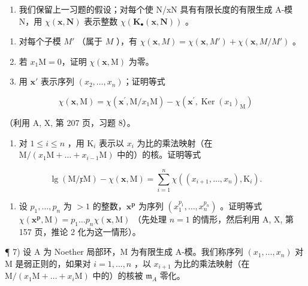 \begin{enumerate}
\def\labelenumi{\arabic{enumi})}
\setcounter{enumi}{5}
\tightlist
\item
  我们保留上一习题的假设；对每个使 N/xN 具有有限长度的有限生成 A-模 N，用 \(\chi(\mathbf{x},\mathbf{N})\) 表示整数 \(\chi(\mathbf{K}_{\bullet}(\mathbf{x},\mathbf{N}))\) 。
\end{enumerate}

\begin{enumerate}
\def\labelenumi{\alph{enumi})}
\item
  对每个子模 \(M'\) （属于 \(M\) ），有 \(\chi(\mathbf{x}, M) = \chi(\mathbf{x}, M') + \chi(\mathbf{x}, M/M')\) 。
\item
  若 \(x_{1}\mathrm{M} = 0\)，证明 \(\chi (\mathbf{x},\mathrm{M})\) 为零。
\item
  用 \(\mathbf{x}'\) 表示序列 \((x_2,\ldots ,x_n)\)；证明等式
\end{enumerate}

\[
\chi (\mathbf {x}, \mathrm{M}) = \chi (\mathbf {x} ^ {\prime}, \mathrm{M} / x _ {1} \mathrm{M}) - \chi (\mathbf {x} ^ {\prime}, \operatorname{Ker} (x _ {1}) _ {\mathrm{M}})
\]

（利用 A, X, 第 207 页，习题 8）。

\begin{enumerate}
\def\labelenumi{\alph{enumi})}
\setcounter{enumi}{3}
\tightlist
\item
  对 \(1 \leqslant i \leqslant n\) ，用 \(\mathrm{K}_i\) 表示以 \(x_i\) 为比的乘法映射（在 \(\mathrm{M}/(x_1\mathrm{M} + \ldots + x_{i-1}\mathrm{M})\) 中的）的核。证明等式
\end{enumerate}

\[
\lg (\mathrm{M} / \mathfrak {x} \mathrm{M}) - \chi (\mathbf {x}, \mathrm{M}) = \sum_ {i = 1} ^ {n} \chi ((x _ {i + 1}, \dots , x _ {n}), \mathrm{K} _ {i}).
\]

\begin{enumerate}
\def\labelenumi{\alph{enumi})}
\setcounter{enumi}{4}
\tightlist
\item
  设 \(p_1, \ldots, p_n\) 为 \(> 1\) 的整数，\(\mathbf{x}^{\mathbf{p}}\) 为序列 \((x_{1}^{p_1}, \ldots, x_n^{p_n})\) 。证明等式 \(\chi(\mathbf{x}^{\mathbf{p}}, \mathrm{M}) = p_1 \ldots p_n \chi(\mathbf{x}, \mathrm{M})\) （先处理 \(n = 1\) 的情形，然后利用 A, X, 第 157 页，推论 2 化为这一情形）。
\end{enumerate}

¶ 7) 设 A 为 Noether 局部环，M 为有限生成 A-模。我们称序列 \((x_1, \ldots, x_n)\) 对 M 是弱正则的，如果对 \(i = 1, \ldots, n\) ，以 \(x_{i+1}\) 为比的乘法映射（在 \(\mathrm{M}/(x_1\mathrm{M} + \ldots + x_i\mathrm{M})\) 中的）的核被 \(\mathfrak{m}_A\) 零化。

